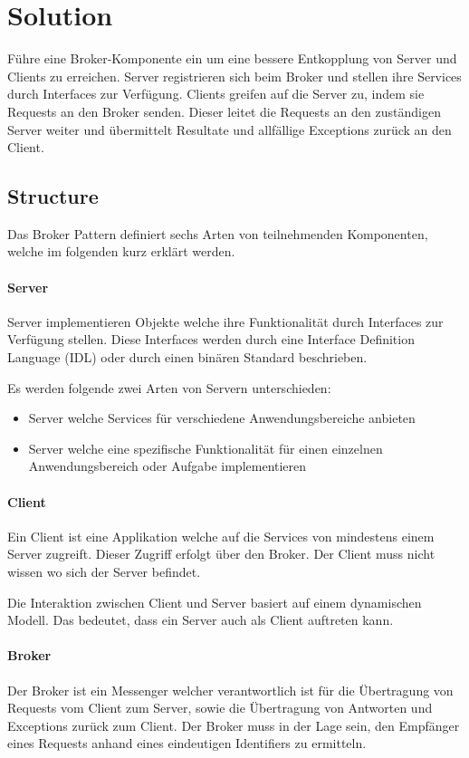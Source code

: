 \section{Solution}
Führe eine Broker-Komponente ein um eine bessere Entkopplung von Server und Clients zu erreichen. Server registrieren sich beim Broker und stellen ihre Services durch Interfaces zur Verfügung. Clients greifen auf die Server zu, indem sie Requests an den Broker senden. Dieser leitet die Requests an den zuständigen Server weiter und übermittelt Resultate und allfällige Exceptions zurück an den Client.

\subsection{Structure}
Das Broker Pattern definiert sechs Arten von teilnehmenden Komponenten, welche im folgenden kurz erklärt werden.

\paragraph{Server}
Server implementieren Objekte welche ihre Funktionalität durch Interfaces zur Verfügung stellen. Diese Interfaces werden durch eine Interface Definition Language (IDL) oder durch einen binären Standard beschrieben.

Es werden folgende zwei Arten von Servern unterschieden:
\begin{itemize}
	\item Server welche Services für verschiedene Anwendungsbereiche anbieten
	\item Server welche eine spezifische Funktionalität für einen einzelnen Anwendungsbereich oder Aufgabe implementieren
\end{itemize}

\paragraph{Client}
Ein Client ist eine Applikation welche auf die Services von mindestens einem Server zugreift. Dieser Zugriff erfolgt über den Broker. Der Client muss nicht wissen wo sich der Server befindet.

Die Interaktion zwischen Client und Server basiert auf einem dynamischen Modell. Das bedeutet, dass ein Server auch als Client auftreten kann.

\paragraph{Broker}
Der Broker ist ein Messenger welcher verantwortlich ist für die Übertragung von Requests vom Client zum Server, sowie die Übertragung von Antworten und Exceptions zurück zum Client. Der Broker muss in der Lage sein, den Empfänger eines Requests anhand eines eindeutigen Identifiers zu ermitteln. 

